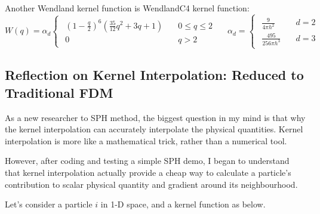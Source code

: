 Another Wendland kernel function is WendlandC4 kernel function:
\begin{equation}
    W(q)=\alpha_d
    \begin{cases}
        \begin{aligned}
            \left(1-\frac{q}{2}\right)^6
            \left(\frac{35}{12}q^2+3q+1\right)\quad &0\leq q \leq 2 \\
            0\quad &q > 2
        \end{aligned}
    \end{cases}\quad
    \alpha_d=
    \begin{cases}
        \begin{aligned}
            \frac{9}{4\pi h^2} \quad &d=2 \\
            \frac{495}{256\pi h^3} \quad &d=3
        \end{aligned}
    \end{cases}
\end{equation}

\subsection{Reflection on Kernel Interpolation: Reduced to Traditional FDM}

As a new researcher to SPH method, 
the biggest question in my mind is that 
why the kernel interpolation can accurately interpolate the physical quantities. 
Kernel interpolation is more like a mathematical trick, rather than a numerical tool.

However, after coding and testing a simple SPH demo, 
I began to understand that kernel interpolation actually provide a cheap way to calculate a 
particle's contribution to scalar physical quantity and gradient around its neighbourhood.

Let's consider a particle $i$ in 1-D space, and a kernel function as below.

\begin{figure}[H]
    \centering
\end{figure}


